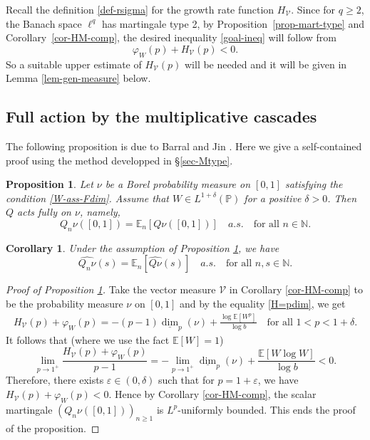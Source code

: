 \documentclass[12pt]{amsart}
\newtheorem{proposition}[theorem]{Proposition}
\newtheorem{corollary}[theorem]{Corollary}
\theoremstyle{definition}
\theoremstyle{remark}
\newcommand{\N}{\mathbb{N}}
\newcommand{\E}{\mathbb{E}}
\newcommand{\PP}{\mathbb{P}}
\newcommand{\ldim}{\underline{\dim}}
\numberwithin{equation}{section}
\begin{document}
Recall the definition \eqref{def-rsigma} for the growth rate function 
$H_\mathcal{V}$.   Since  for $q\ge 2$,  the Banach space $\ell^q$ has martingale type 2,  by  Proposition~\ref{prop-mart-type} and Corollary~\ref{cor-HM-comp}, the desired inequality \eqref{goal-ineq} will follow from 
\[
\varphi_W(p)+ H_\mathcal{V}(p)<0. 
\]
So  a suitable  upper estimate of $H_\mathcal{V}(p)$ will be needed and  it will be given  in Lemma \ref{lem-gen-measure} below. 




\subsection{Full action by the multiplicative cascades}

The following proposition is due to Barral and Jin \cite[Theorem 2.3 (a)]{JInxiong-Barral-IMRN}.  Here we give a self-contained proof using the method developped in \S \ref{sec-Mtype}. 
\begin{proposition}\label{prop-full}
Let $\nu$ be a  Borel probability measure on $[0,1]$ satisfying the condition \eqref{W-ass-Fdim}.  Assume that $W\in L^{1+\delta}(\PP)$ for a positive $\delta>0$.   Then  $Q$ acts fully on $\nu$, namely, 
\[
Q_n\nu([0,1])=  \E_n[Q\nu([0,1])] \quad a.s. \quad \text{for all $n\in \N$}.
\]
 \end{proposition}
 
 \begin{corollary}\label{cor-Qnu-fourier}
 Under the assumption of Proposition \ref{prop-full}, we have  
 \[
\widehat{ Q_n\nu}(s) =  \E_n[\widehat{Q\nu}(s)] \quad a.s. \quad \text{for all $n, s \in \N$}.
 \]
 \end{corollary}
 
 
 

 
 \begin{proof}[Proof of Proposition \ref{prop-full}]
 Take the vector measure $\mathcal{V}$ in Corollary \ref{cor-HM-comp} to be the probability measure $\nu$ on $[0,1]$ and by the equality \eqref{H=pdim}, we get 
 \begin{align*}
H_\mathcal{V}(p) +  \varphi_W(p)  =  -(p-1) \ldim_p(\nu)  + \frac{\log \E[W^p]}{\log b} \quad \text{for all $1< p< 1 + \delta$}.
 \end{align*}
 It follows that (where we use the fact $\E[W]=1$) 
 \[
\lim_{p\to1^{+}} \frac{H_\mathcal{V}(p) +  \varphi_W(p)}{p-1} = - \lim_{p\to 1^{+}} \ldim_p(\nu) +  \frac{\E[W\log W]}{\log b}<0. 
 \]
 Therefore, there exists $\varepsilon\in(0, \delta)$ such that for $p = 1 + \varepsilon$, we have  $H_\mathcal{V}(p) +  \varphi_W(p)<0$. Hence by Corollary \ref{cor-HM-comp}, the  scalar martingale  $(Q_n\nu([0,1]))_{n\ge 1}$ is $L^p$-uniformly bounded. This ends the proof of the proposition. 
 \end{proof}
 
\end{document}
